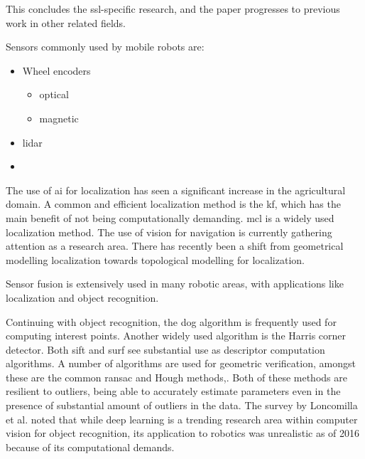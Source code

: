 
This concludes the \ac{ssl}-specific research, and the paper progresses to previous work in other related fields.


Sensors commonly used by mobile robots are\:\cite{alatise_review_2020}:
\begin{itemize}
    \item Wheel encoders
    \begin{itemize}
        \item optical
        \item magnetic
    \end{itemize}
    \item \ac{lidar}
    \item 
\end{itemize}


The use of \ac{ai} for localization has seen a significant increase in the agricultural domain\:\cite{rahman_tahir_localization_2022}.
A common and efficient localization method is the \ac{kf}, which has the main benefit of not being computationally demanding\:\cite{alatise_review_2020}.
\ac{mcl} is a widely used localization method\:\cite{akail_reliability_2018}.
The use of vision for navigation is currently gathering attention as a research area\:\cite{alatise_review_2020}.
There has recently been a shift from geometrical modelling localization towards topological modelling for localization\:\cite{alatise_review_2020}.


Sensor fusion is extensively used in many robotic areas, with applications like localization and object recognition\:\cite{alatise_review_2020}.

Continuing with object recognition,
the \ac{dog} algorithm is frequently used for computing interest points\:\cite{loncomilla_object_2016}. Another widely used algorithm is the Harris corner detector\:\cite{alatise_review_2020}.
Both \ac{sift} and \ac{surf} see substantial use as descriptor computation algorithms\:\cite{loncomilla_object_2016}.
A number of algorithms are used for geometric verification, amongst these are the common \ac{ransac} and Hough methods\:\cite{loncomilla_object_2016},\cite{alatise_review_2020}.
Both of these methods are resilient to outliers, being able to accurately estimate parameters even in the presence of substantial amount of outliers in the data\:\cite{alatise_review_2020}. 
The survey by Loncomilla et al. noted that while deep learning is a trending research area within computer vision for object recognition, its application to robotics was unrealistic as of 2016 because of its computational demands\:\cite{loncomilla_object_2016}.

